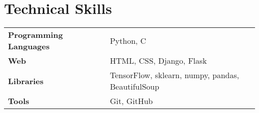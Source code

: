 \documentclass[10pt]{article}
\newenvironment{zitemize}{
\begin{itemize}\itemsep2pt \parskip0pt \parsep1pt}
{\end{itemize}\vspace{-0.5cm}}
\newcommand{\hskills}[1]{
\textbf{\bfseries #1} }
\begin{document}



\section{Technical Skills}
\begin{tabular}{p{11em} p{1em} p{43em}}
\hskills{Programming Languages }&  &  Python, C \\
\hskills{Web} &  & HTML, CSS, Django, Flask \\
\hskills{Libraries} &  & TensorFlow, sklearn, numpy, pandas, BeautifulSoup \\
\hskills{Tools} &  & Git, GitHub \\

\end{tabular}
\vspace{-0.2cm}
\end{document}
